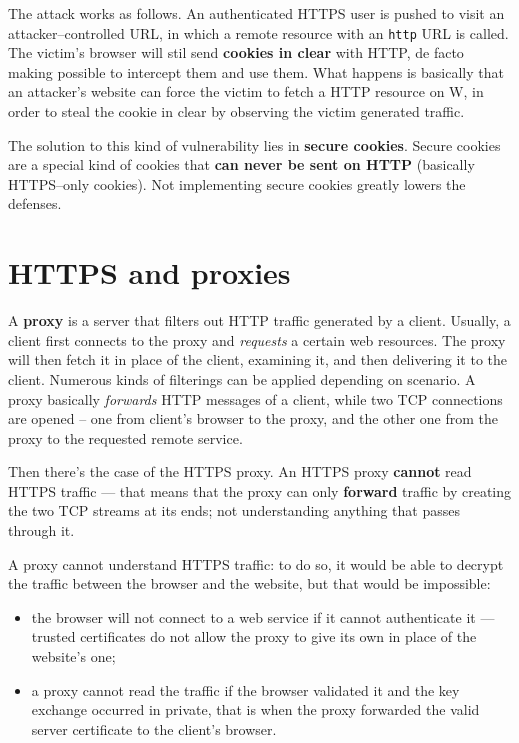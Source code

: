\documentclass[10pt]{extreport}
\begin{document}
The attack works as follows. An authenticated HTTPS user is pushed to visit an
attacker--controlled URL, in which a remote resource with an \texttt{http} URL
is called. The victim's browser will stil send \textbf{cookies in clear} with
HTTP, de facto making possible to intercept them and use them. What happens is
basically that an attacker's website can force the victim to fetch a HTTP
resource on W, in order to steal the cookie in clear by observing the victim
generated traffic.

The solution to this kind of vulnerability lies in \textbf{secure cookies}.
Secure cookies are a special kind of cookies that \textbf{can never be sent on
HTTP} (basically HTTPS--only cookies). Not implementing secure cookies greatly
lowers the defenses.

\section{HTTPS and proxies}

A \textbf{proxy} is a server that filters out HTTP traffic generated by a
client. Usually, a client first connects to the proxy and \emph{requests} a
certain web resources. The proxy will then fetch it in place of the client,
examining it, and then delivering it to the client. Numerous kinds of
filterings can be applied depending on scenario. A proxy basically
\emph{forwards} HTTP messages of a client, while two TCP connections are opened
-- one from client's browser to the proxy, and the other one from the proxy to
the requested remote service.

Then there's the case of the HTTPS proxy. An HTTPS proxy \textbf{cannot} read
HTTPS traffic --- that means that the proxy can only \textbf{forward} traffic by
creating the two TCP streams at its ends; not understanding anything that
passes through it.

A proxy cannot understand HTTPS traffic: to do so, it would be able to decrypt
the traffic between the browser and the website, but that would be impossible:
\begin{itemize}
    \item the browser will not connect to a web service if it cannot
        authenticate it --- trusted certificates do not allow the proxy to give
        its own in place of the website's one;
    \item a proxy cannot read the traffic if the browser validated it and the
        key exchange occurred in private, that is when the proxy forwarded the
        valid server certificate to the client's browser.
\end{itemize}
\end{document}
